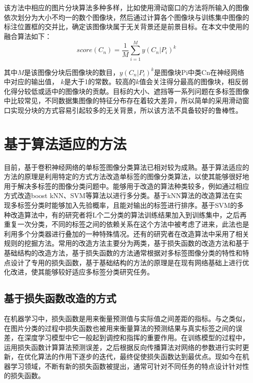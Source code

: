 该方法中相应的图片分块算法多种多样，比如使用滑动窗口的方法将所输入的图像依次划分为大小不均一的数个图像块，然后通过计算各个图像块与训练集中图像的标注位置框的交并比，确定该图像块属于无关背景还是前景目标。在本文中使用的融合算法如下：
\begin{equation}
\label{dscNoStgProof0}
score(C_n) = \frac{1}{M}\sum_{i=1}^M y(C_n|P_i)^k
\end{equation}

其中$M$是该图像分块后图像块的数目，$y(C_n|P_i)^k$是图像块Pi中类Cn在神经网络中对应的输出值， $k$是大于1的常数。较高的$k$值会关注得分最高的图像块，相反弱化得分较低或适中的图像块的贡献。目标的大小、遮挡等一系列问题在多标签图像中比较常见，不同数据集图像的特征分布存在着较大差异，所以简单的采用滑动窗口实现分块的方式容易引起较多的无关背景，所以该方法不具备较好的鲁棒性。

\section{基于算法适应的方法}
目前，基于卷积神经网络的单标签图像分类算法已相对较为成熟。基于算法适应的方法的原理是利用特定的方式方法改造单标签的图像分类算法，以使其能够很好地用于解决多标签的图像分类问题中。能够用于改造的算法种类较多，例如通过相应方式改造boost kNN、SVM等算法以进行多分类。基于kNN算法的改造算法在实现多标签分类时能够加入先验概率，且能对输出的标签进行排序。基于SVM的多种改造算法中，有的研究者将L个二分类的算法训练结果加入到训练集中，之后再重复一次分类，不同的标签之间的依赖关系在这个方法中被考虑了进来，此法也是利用多个分类器进行叠加的一种特殊情况。还有的研究者在改造算法中采用了相关规则的挖掘方法。常用的改造方法主要分为两类，基于损失函数的改造方法和基于基础结构的改造方法，基于损失函数的方法通常根据对多标签图像分类的特性和特点设计了专用的损失函数，基于基础结构的方法的原理是在现有网络基础上进行优化改进，使其能够较好适应多标签分类研究任务。

\subsection{基于损失函数改造的方式}
在机器学习中，损失函数是用来衡量预测值与实际值之间差距的指标。与之类似，在图片分类的过程中损失函数也被用来衡量算法的预测结果与真实标签之间的误差，在深度学习模型中它一般起到调控和指挥的重要作用。在训练模型的过程中，运用损失函数计算算法预测误差，之后根据反向传播算法对网络的参数进行实时更新，在优化算法的作用下逐步的迭代，最终促使损失函数达到最优点。现如今在机器学习领域，不断有新的损失函数被提出，通常可针对不同任务的特点设计针对性的损失函数。

